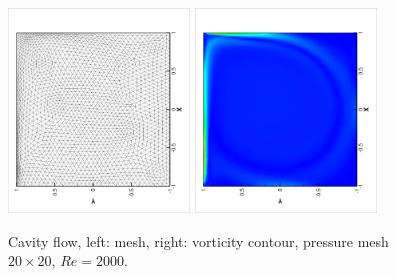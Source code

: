 \documentclass{eajam}
\begin{document}
       
       \begin{figure}[!htbp]
         \begin{center}
             \includegraphics[width = 0.43\textwidth, angle = -90]{picture/cavity_flow_data/moving_mesh_20.eps}
             \includegraphics[width = 0.43\textwidth, angle = -90]{picture/cavity_flow_data/vortex_mesh20.eps}
        \end{center}
        \caption{\small Cavity flow, left: mesh, right: vorticity
          contour, pressure mesh $20 \times 20$, $Re = 2000$.}
        \label{fig::cavity_flow_mesh}
       \end{figure}
\end{document}
